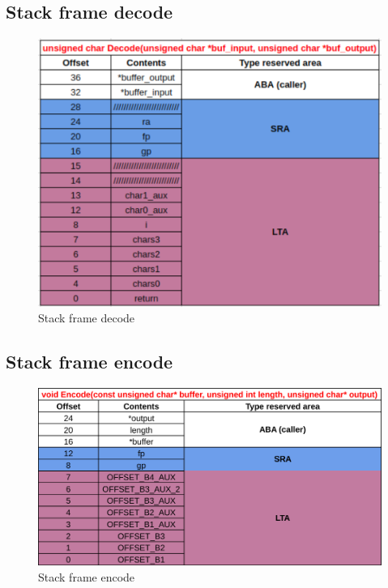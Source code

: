 \documentclass[11pt,a4paper]{article}
\begin{document}
\subsection{Stack frame decode}
\begin{figure}[H]
  \centering
    \includegraphics[width=14cm]{decodeStackFrame}
    \caption{Stack frame decode}
  \label{fig:decodeStackFrame}
\end{figure}

\subsection{Stack frame encode}
\begin{figure}[H]
  \centering
    \includegraphics[width=14cm]{encodeStackFrame}
    \caption{Stack frame encode}
  \label{fig:encodeStackFrame}
\end{figure}
\end{document}
